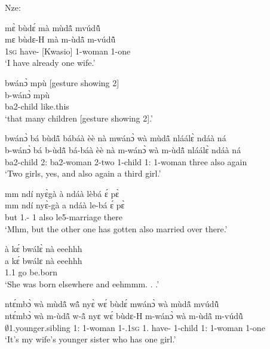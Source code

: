 \noindent Nze:

\begin{exe}[(C234)]  
\exC\label{143} 
  \glll  mɛ̀ bùdɛ́ mà mùdã̂ mvúdũ̂ \\
         mɛ bùdɛ-H mà m-ùdã̂ m-vúdũ̂ \\
         1\textsc{sg} have-{\R} {\COMPL}[Kwasio]  {\N}1-woman 1-one  \\
    \trans `I have already one wife.'
 
\exC\label{144} 
  \glll  bwánɔ̀ mpù [gesture showing 2] \\
          b-wánɔ̀ mpù \\
         ba2-child like.this   \\
    \trans `that many children [gesture showing 2].'
 
\exC\label{145} 
  \glll  bwánɔ̀ bá bùdã̂ bábáà èè nà mwánɔ̀ wà mùdã̂ nláálɛ̀ ndáà ná \\
         b-wánɔ̀ bá b-ùdã̂ bá-báà èè nà m-wánɔ̀ wà m-ùdã̂ nláálɛ̀ ndáà ná \\
         ba2-child 2:{\ATT}  ba2-woman 2-two {\EXCL} {\CONJ} {\N}1-child 1:{\ATT}  {\N}1-woman three also again   \\
    \trans `Two girls, yes, and also again a third girl.'
 
\exC\label{146} 
  \glll  mm ndí nyɛ̀gà à ndáà lèbá ɛ́ pɛ̀ \\
        mm ndí nyɛ̀-gà a ndáà le-bá ɛ́ pɛ̀ \\
          {\EXCL} but 1.{\SBJ}-{\CONTR} 1 also le5-marriage {\LOC} there  \\
    \trans `Mhm, but the other one has gotten also married over there.'
 
\exC\label{147} 
  \glll  à kɛ́ bwálɛ̀ nà eeehhh  \\
          a kɛ́ bwálɛ nà eeehhh \\
          1.{\PST}1 go be.born {\CONJ} {\EXCL}  \\
    \trans `She was born elsewhere and eehmmm. . .'
 
\exC\label{148} 
  \glll ntɛ́mbɔ̀ wà mùdã̂ wã̂ nyɛ̀ wɛ́ bùdɛ́ mwánɔ̀ wà mùdã̂ mvúdũ̂ \\
       ntɛ́mbɔ̀ wà m-ùdã̂ w-ã̂ nyɛ wɛ́ bùdɛ-H m-wánɔ̀ wà m-ùdã̂ m-vúdũ̂ \\
        $\emptyset$1.younger.sibling 1:{\ATT}  {\N}1-woman 1-{\POSS}.1\textsc{sg} 1.{\SBJ}  {\ID} have-{\R} {\N}1-child 1:{\ATT}  {\N}1-woman 1-one    \\
    \trans `It's my wife's younger sister who has one girl.'
 

\end{exe}
